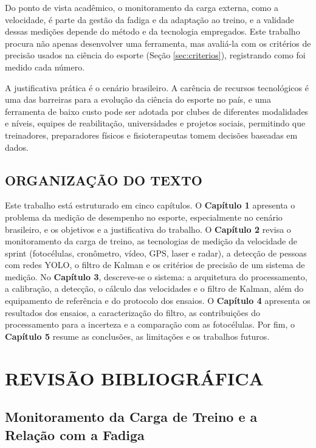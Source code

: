 \documentclass[
    12pt,               %
    openright,          %
    twoside,            %
    a4paper,            %
    chapter=TITLE,      %
    english,            %
    brazil              %
    ]{abntex2}
\begin{document}
Do ponto de vista acadêmico, o monitoramento da carga externa, como a velocidade, é parte da gestão da fadiga e da adaptação ao treino, e a validade dessas medições depende do método e da tecnologia empregados. Este trabalho procura não apenas desenvolver uma ferramenta, mas avaliá-la com os critérios de precisão usados na ciência do esporte (Seção \ref{sec:criterios}), registrando como foi medido cada número.

A justificativa prática é o cenário brasileiro. A carência de recursos tecnológicos é uma das barreiras para a evolução da ciência do esporte no país, e uma ferramenta de baixo custo pode ser adotada por clubes de diferentes modalidades e níveis, equipes de reabilitação, universidades e projetos sociais, permitindo que treinadores, preparadores físicos e fisioterapeutas tomem decisões baseadas em dados.

\section{ORGANIZAÇÃO DO TEXTO}

Este trabalho está estruturado em cinco capítulos. O \textbf{Capítulo 1} apresenta o problema da medição de desempenho no esporte, especialmente no cenário brasileiro, e os objetivos e a justificativa do trabalho. O \textbf{Capítulo 2} revisa o monitoramento da carga de treino, as tecnologias de medição da velocidade de sprint (fotocélulas, cronômetro, vídeo, GPS, laser e radar), a detecção de pessoas com redes YOLO, o filtro de Kalman e os critérios de precisão de um sistema de medição. No \textbf{Capítulo 3}, descreve-se o sistema: a arquitetura do processamento, a calibração, a detecção, o cálculo das velocidades e o filtro de Kalman, além do equipamento de referência e do protocolo dos ensaios. O \textbf{Capítulo 4} apresenta os resultados dos ensaios, a caracterização do filtro, as contribuições do processamento para a incerteza e a comparação com as fotocélulas. Por fim, o \textbf{Capítulo 5} resume as conclusões, as limitações e os trabalhos futuros.

\chapter{REVISÃO BIBLIOGRÁFICA}

\section{Monitoramento da Carga de Treino e a Relação com a Fadiga}
\end{document}
